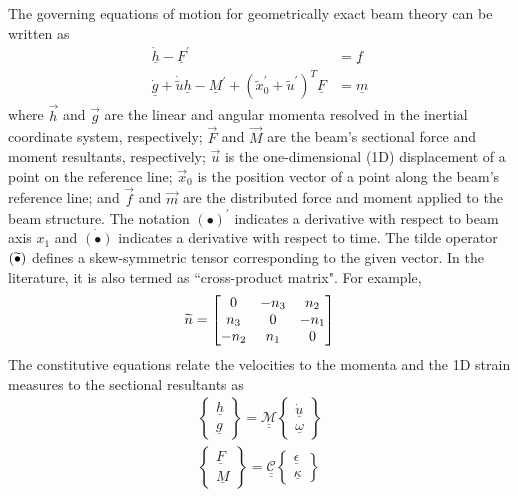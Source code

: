  The governing equations of motion for geometrically exact beam theory can be written as \cite{Bauchau:2010}
\begin{align}
	\label{GovernGEBT-1}
	\dot{\underline{h}} - \underline{F}^\prime &= \underline{f} \\
	\label{GovernGEBT-2}
	\dot{\underline{g}} + \dot{\tilde{u}} \underline{h} - \underline{M}^\prime + (\tilde{x}_0^\prime + \tilde{u}^\prime)^T \underline{F} &= \underline{m}
\end{align}
where $\vec{h}$ and $\vec{g}$ are the linear and angular momenta resolved in the inertial coordinate system, respectively; $\vec{F}$ and $\vec{M}$ are the beam's sectional force and moment resultants, respectively; $\vec{u}$ is the one-dimensional (1D) displacement of a point on the reference line; $\vec{x}_0$ is the position vector of a point along the beam's reference line;  and $\vec{f}$ and $\vec{m}$ are the distributed force and moment applied to the beam structure.  The notation $(\bullet)^\prime$ indicates a derivative with respect to beam axis $x_1$ and $\dot{(\bullet)}$ indicates a derivative with respect to time. The tilde operator $(\widetilde{\bullet})$ defines a skew-symmetric tensor corresponding to the given vector. In the literature, it is also termed as ``cross-product matrix". For example,
\[
	\widetilde{n} = 
	     		\begin{bmatrix}
			0 & -n_3 & n_2 \\
			n_3 & 0 & -n_1 \\
			-n_2 & n_1 & 0\\
			\end{bmatrix}	
\]
The constitutive equations relate the velocities to the momenta and the 1D strain measures to the sectional resultants as
\begin{align}
	\label{ConstitutiveMass}
	\begin{Bmatrix}
	\underline{h} \\
	\underline{g}
	\end{Bmatrix}
	= \underline{\underline{\mathcal{M}}} \begin{Bmatrix}
	\dot{\underline{u}} \\
	\underline{\omega}
	\end{Bmatrix} \\
	\label{ConstitutiveStiff}
	\begin{Bmatrix}
	\underline{F} \\
	\underline{M}
	\end{Bmatrix}
	= \underline{\underline{\mathcal{C}}} \begin{Bmatrix}
	\underline{\epsilon} \\
	\underline{\kappa}
	\end{Bmatrix}
\end{align}
